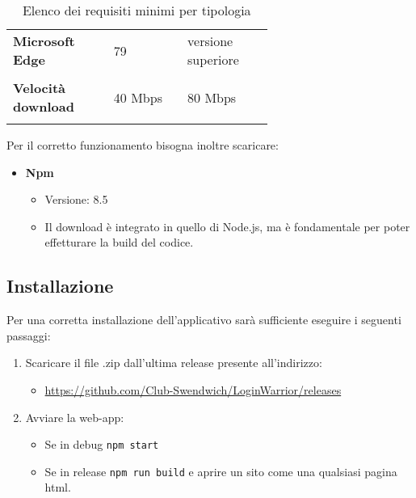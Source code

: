 {\begin{longtable}{>{\raggedright\arraybackslash}m{0.24\linewidth}m{0.20\linewidth}m{0.20\linewidth}}
    \rowcolor[RGB]{233, 245, 206}
    \textbf{Microsoft Edge} & 79 & versione superiore \\

    \rowcolor[RGB]{47, 106, 73}
    \multicolumn{3}{>{\centering\arraybackslash}m{0.693\linewidth}}{\textcolor{white}{\textbf{Connessione}}}\\

    \rowcolor[RGB]{216, 235, 171}
    \textbf{Velocità download} & 40 Mbps & 80 Mbps \\

    \caption{Elenco dei requisiti minimi per tipologia}
\end{longtable}
}

Per il corretto funzionamento bisogna inoltre scaricare:
\begin{itemize}
    \item \textbf{Npm}
    \begin{itemize}
        \item Versione: 8.5
        \item Il download è integrato in quello di Node.js, ma è fondamentale per poter effetturare la build del codice.
    \end{itemize}
\end{itemize}

\subsection{Installazione}

Per una corretta installazione dell'applicativo sarà sufficiente eseguire i seguenti passaggi:

\begin{enumerate}
    \item Scaricare il file .zip dall'ultima release presente all'indirizzo:
    \begin{itemize}
        \item \href{https://github.com/Club-Swendwich/LoginWarrior/releases}{https://github.com/Club-Swendwich/LoginWarrior/releases}
    \end{itemize}
    \item Avviare la web-app:
    \begin{itemize}
        \item Se in debug \texttt{npm start}
        \item Se in release \texttt{npm run build} e aprire un sito come una qualsiasi pagina html.
    \end{itemize}
\end{enumerate}
